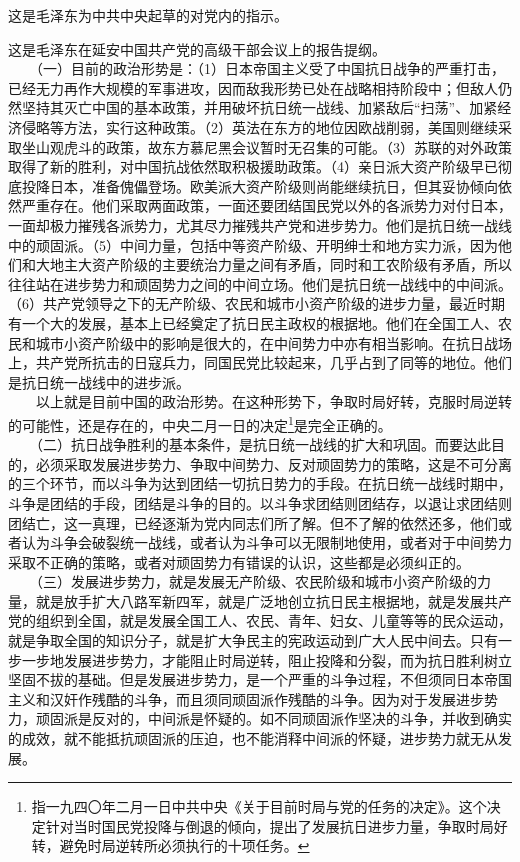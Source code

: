 \documentclass[cn,11pt,chinese]{elegantbook}
\begin{document}
\begin{introduction}\item  这是毛泽东为中共中央起草的对党内的指示。\end{introduction}
这是毛泽东在延安中国共产党的高级干部会议上的报告提纲。\\
　　（一）目前的政治形势是：（1）日本帝国主义受了中国抗日战争的严重打击，已经无力再作大规模的军事进攻，因而敌我形势已处在战略相持阶段中；但敌人仍然坚持其灭亡中国的基本政策，并用破坏抗日统一战线、加紧敌后“扫荡”、加紧经济侵略等方法，实行这种政策。（2）英法在东方的地位因欧战削弱，美国则继续采取坐山观虎斗的政策，故东方慕尼黑会议暂时无召集的可能。（3）苏联的对外政策取得了新的胜利，对中国抗战依然取积极援助政策。（4）亲日派大资产阶级早已彻底投降日本，准备傀儡登场。欧美派大资产阶级则尚能继续抗日，但其妥协倾向依然严重存在。他们采取两面政策，一面还要团结国民党以外的各派势力对付日本，一面却极力摧残各派势力，尤其尽力摧残共产党和进步势力。他们是抗日统一战线中的顽固派。（5）中间力量，包括中等资产阶级、开明绅士和地方实力派，因为他们和大地主大资产阶级的主要统治力量之间有矛盾，同时和工农阶级有矛盾，所以往往站在进步势力和顽固势力之间的中间立场。他们是抗日统一战线中的中间派。（6）共产党领导之下的无产阶级、农民和城市小资产阶级的进步力量，最近时期有一个大的发展，基本上已经奠定了抗日民主政权的根据地。他们在全国工人、农民和城市小资产阶级中的影响是很大的，在中间势力中亦有相当影响。在抗日战场上，共产党所抗击的日寇兵力，同国民党比较起来，几乎占到了同等的地位。他们是抗日统一战线中的进步派。\\
　　以上就是目前中国的政治形势。在这种形势下，争取时局好转，克服时局逆转的可能性，还是存在的，中央二月一日的决定\footnote[1]{ 指一九四〇年二月一日中共中央《关于目前时局与党的任务的决定》。这个决定针对当时国民党投降与倒退的倾向，提出了发展抗日进步力量，争取时局好转，避免时局逆转所必须执行的十项任务。}是完全正确的。\\
　　（二）抗日战争胜利的基本条件，是抗日统一战线的扩大和巩固。而要达此目的，必须采取发展进步势力、争取中间势力、反对顽固势力的策略，这是不可分离的三个环节，而以斗争为达到团结一切抗日势力的手段。在抗日统一战线时期中，斗争是团结的手段，团结是斗争的目的。以斗争求团结则团结存，以退让求团结则团结亡，这一真理，已经逐渐为党内同志们所了解。但不了解的依然还多，他们或者认为斗争会破裂统一战线，或者认为斗争可以无限制地使用，或者对于中间势力采取不正确的策略，或者对顽固势力有错误的认识，这些都是必须纠正的。\\
　　（三）发展进步势力，就是发展无产阶级、农民阶级和城市小资产阶级的力量，就是放手扩大八路军新四军，就是广泛地创立抗日民主根据地，就是发展共产党的组织到全国，就是发展全国工人、农民、青年、妇女、儿童等等的民众运动，就是争取全国的知识分子，就是扩大争民主的宪政运动到广大人民中间去。只有一步一步地发展进步势力，才能阻止时局逆转，阻止投降和分裂，而为抗日胜利树立坚固不拔的基础。但是发展进步势力，是一个严重的斗争过程，不但须同日本帝国主义和汉奸作残酷的斗争，而且须同顽固派作残酷的斗争。因为对于发展进步势力，顽固派是反对的，中间派是怀疑的。如不同顽固派作坚决的斗争，并收到确实的成效，就不能抵抗顽固派的压迫，也不能消释中间派的怀疑，进步势力就无从发展。\\
\end{document}
